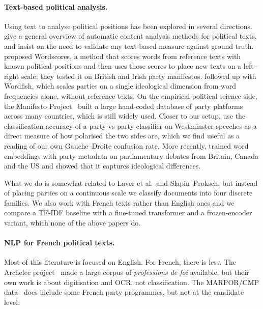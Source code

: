 \documentclass{article}
\begin{document}
\paragraph{Text-based political analysis.}
Using text to analyse political positions has been explored in several directions. \citet{grimmer2013text} give a general overview of automatic content analysis methods for political texts, and insist on the need to validate any text-based measure against ground truth. \citet{laver2003extracting} proposed Wordscores, a method that scores words from reference texts with known political positions and then uses those scores to place new texts on a left--right scale; they tested it on British and Irish party manifestos. \citet{slapin2008scaling} followed up with Wordfish, which scales parties on a single ideological dimension from word frequencies alone, without reference texts. On the empirical-political-science side, the Manifesto Project~\citep{volkens2013manifesto} built a large hand-coded database of party platforms across many countries, which is still widely used. Closer to our setup, \citet{peterson2018classification} use the classification accuracy of a party-vs-party classifier on Westminster speeches as a direct measure of how polarised the two sides are, which we find useful as a reading of our own Gauche--Droite confusion rate. More recently, \citet{rheault2020word} trained word embeddings with party metadata on parliamentary debates from Britain, Canada and the US and showed that it captures ideological differences.

What we do is somewhat related to Laver et al.\ and Slapin--Proksch, but instead of placing parties on a continuous scale we classify documents into four discrete families. We also work with French texts rather than English ones and we compare a TF-IDF baseline with a fine-tuned transformer and a frozen-encoder variant, which none of the above papers do.

\paragraph{NLP for French political texts.}
Most of this literature is focused on English. For French, there is less. The Archelec project~\citep{archelec} made a large corpus of \textit{professions de foi} available, but their own work is about digitisation and OCR, not classification. The MARPOR/CMP data~\citep{volkens2013manifesto} does include some French party programmes, but not at the candidate level.
\end{document}
